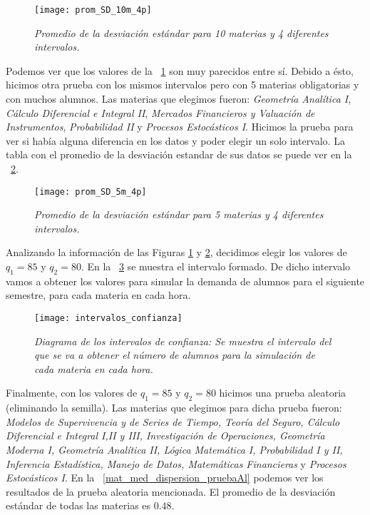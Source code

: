 \begin{figure}[H]
\centering
\texttt{[image: prom\_SD\_10m\_4p]} %
\caption[\textit{Promedio de la desviación estándar: 10 materias, 4 intervalos}]{\textit{Promedio de la desviación estándar para 10 materias y 4 diferentes intervalos.}}\label{promSD_10m_4p}
\end{figure}

Podemos ver que los valores de la \figurename{~\ref{promSD_10m_4p}} son muy parecidos entre sí. Debido a ésto, hicimos otra prueba con los mismos intervalos pero con 5 materias obligatorias y con muchos alumnos. Las materias que elegimos fueron: \textit{Geometría Analítica I}, \textit{Cálculo Diferencial e Integral II}, \textit{Mercados Financieros y Valuación de Instrumentos}, \textit{Probabilidad II} y \textit{Procesos Estocásticos I}. Hicimos la prueba para ver si había alguna diferencia en los datos y poder elegir un solo intervalo. La tabla con el promedio de la desviación estandar de sus datos se puede ver en la \figurename{~\ref{promSD_5m_4p}}.


\begin{figure}[H]
\centering
\texttt{[image: prom\_SD\_5m\_4p]} %
\caption[\textit{Promedio de la desviación estándar: 5 materias, 4 intervalos}]{\textit{Promedio de la desviación estándar para 5 materias y 4 diferentes intervalos.}}\label{promSD_5m_4p}
\end{figure}

Analizando la información de las Figuras \ref{promSD_10m_4p} y \ref{promSD_5m_4p}, decidimos elegir los valores de $q_{1} = 85$ y $q_{2} = 80$. En la \figurename{~\ref{interConf}} se muestra el intervalo formado. De dicho intervalo vamos a obtener los valores para simular la demanda de alumnos para el siguiente semestre, para cada materia en cada hora.

\begin{figure}[H]
\centering
\texttt{[image: intervalos\_confianza]} %
\caption[\textit{Diagrama de los intervalos de confianza}]{\textit{Diagrama de los intervalos de confianza: Se muestra el intervalo del que se va a obtener el número de alumnos para la simulación de cada materia en cada hora.}}\label{interConf}
\end{figure}

Finalmente, con los valores de $q_{1} = 85$ y $q_{2} = 80$ hicimos una prueba aleatoria (eliminando la semilla). Las materias que elegimos para dicha prueba fueron: \textit{Modelos de Supervivencia y de Series de Tiempo, Teoría del Seguro, Cálculo Diferencial e Integral I,II y III, Investigación de Operaciones, Geometría Moderna I, Geometría Analítica II, Lógica Matemática I, Probabilidad I y II, Inferencia Estadística, Manejo de Datos, Matemáticas Financieras} y \textit{Procesos Estocásticos I}. En la \figurename{~\ref{mat_med_dispersion_pruebaAl}} podemos ver los resultados de la prueba aleatoria mencionada. El promedio de la desviación estándar de todas las materias es $0.48$.%

